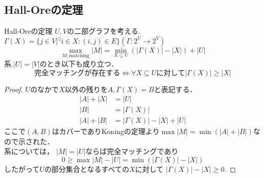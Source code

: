 \subsection{Hall-Oreの定理}
\begin{itembox}[l]{Hall-Oreの定理}
$U,V$の二部グラフを考える.
$\Gamma (X)=\{ j\in V| {}^{\exists}i\in X:(i,j)\in E\} (\Gamma :2^U \to 2^V )$
\begin{equation}
  \max_{M;\mathrm{matching}} |M|=\min_{X\subseteq U}(|\Gamma (X)|-|X|)+|U|
\end{equation}
系.$|U|=|V|$のとき以下も成り立つ．
\begin{equation}
  完全マッチングが存在する\Leftrightarrow \forall X \subseteq Uに対して|\Gamma (X)|\geq |X|
\end{equation}
\end{itembox}
\begin{proof}
$U$のなかで$X$以外の残りを$A, \Gamma (X)=B$と表記する．
\begin{align}
  |A|+|X|&=|U|\\
  |B|&=|\Gamma (X)|\\
  |A|+|B|&=|\Gamma (X)|-|X|+|U|
\end{align}
ここで$(A,B)$はカバーでありKoningの定理より$\max |M|=\min (|A|+|B|)$なので示された．\\
系については，
$|M|=|U|$ならば完全マッチングであり
\begin{equation}
  0\geq \max |M|-|U|=\min (|\Gamma (X)|-|X|)
\end{equation}
したがって$U$の部分集合となるすべての$X$に対して
$|\Gamma (X)|-|X|\geq 0$.
\end{proof}

